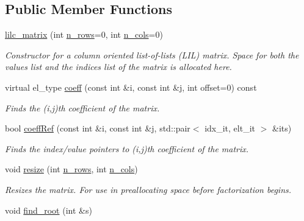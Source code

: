\subsection*{Public Member Functions}
\begin{DoxyCompactItemize}
\item 
\hyperlink{classlilc__matrix_acdaad0931ff27d7bfc361d3033713914}{lilc\+\_\+matrix} (int \hyperlink{classlil__sparse__matrix_a29e9ea5f7c8a9fca9029a91b39c592e0}{n\+\_\+rows}=0, int \hyperlink{classlil__sparse__matrix_ac88631204bcf7c9a223fb082a7d0cd3d}{n\+\_\+cols}=0)\hypertarget{classlilc__matrix_acdaad0931ff27d7bfc361d3033713914}{}\label{classlilc__matrix_acdaad0931ff27d7bfc361d3033713914}

\begin{DoxyCompactList}\small\item\em Constructor for a column oriented list-\/of-\/lists (L\+IL) matrix. Space for both the values list and the indices list of the matrix is allocated here. \end{DoxyCompactList}\item 
virtual el\+\_\+type \hyperlink{classlilc__matrix_a0e59d373ec514c8cb264da653d36f753}{coeff} (const int \&i, const int \&j, int offset=0) const 
\begin{DoxyCompactList}\small\item\em Finds the (i,j)th coefficient of the matrix. \end{DoxyCompactList}\item 
bool \hyperlink{classlilc__matrix_a327c165f0c90cd362dd14fc6421ebadd}{coeff\+Ref} (const int \&i, const int \&j, std\+::pair$<$ idx\+\_\+it, elt\+\_\+it $>$ \&its)
\begin{DoxyCompactList}\small\item\em Finds the index/value pointers to (i,j)th coefficient of the matrix. \end{DoxyCompactList}\item 
void \hyperlink{classlilc__matrix_aca815e0ac073abb1e6ef888b09f9e795}{resize} (int \hyperlink{classlil__sparse__matrix_a29e9ea5f7c8a9fca9029a91b39c592e0}{n\+\_\+rows}, int \hyperlink{classlil__sparse__matrix_ac88631204bcf7c9a223fb082a7d0cd3d}{n\+\_\+cols})
\begin{DoxyCompactList}\small\item\em Resizes the matrix. For use in preallocating space before factorization begins. \end{DoxyCompactList}\item 
void \hyperlink{classlilc__matrix_a46161695c5bfb0f43a7dedb9b9146fef}{find\+\_\+root} (int \&s)

\end{DoxyCompactItemize}
